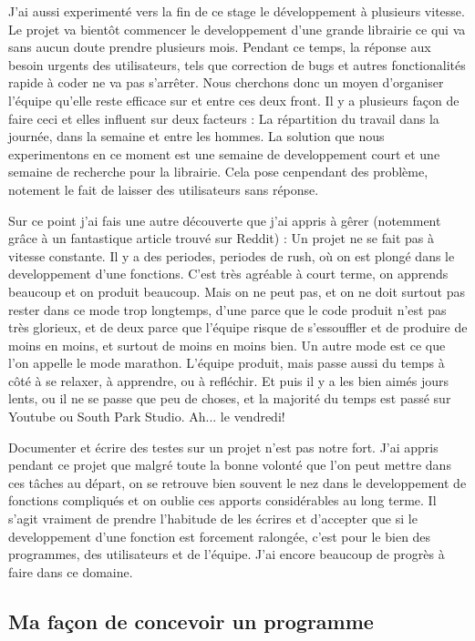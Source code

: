 J'ai aussi experimenté vers la fin de ce stage le développement à plusieurs vitesse. Le projet va bientôt commencer le developpement d'une grande librairie ce qui va sans aucun doute prendre plusieurs mois. Pendant ce temps, la réponse aux besoin urgents des utilisateurs, tels que correction de bugs et autres fonctionalités rapide à coder ne va pas s'arrêter. Nous cherchons donc un moyen d'organiser l'équipe qu'elle reste efficace sur et entre ces deux front. Il y a plusieurs façon de faire ceci et elles influent sur deux facteurs : La répartition du travail dans la journée, dans la semaine et entre les hommes. La solution que nous experimentons en ce moment est une semaine de developpement court et une semaine de recherche pour la librairie. Cela pose cenpendant des problème, notement le fait de laisser des utilisateurs sans réponse.

Sur ce point j'ai fais une autre découverte que j'ai appris à gêrer (notemment grâce à un fantastique article trouvé sur Reddit)%
: Un projet ne se fait pas à vitesse constante. Il y a des periodes, periodes de rush, où on est plongé dans le developpement d'une fonctions. C'est très agréable à court terme, on apprends beaucoup et on produit beaucoup. Mais on ne peut pas, et on ne doit surtout pas rester dans ce mode trop longtemps, d'une parce que le code produit n'est pas très glorieux, et de deux parce que l'équipe risque de s'essouffler et de produire de moins en moins, et surtout de moins en moins bien. Un autre mode est ce que l'on appelle le mode marathon. L'équipe produit, mais passe aussi du temps à côté à se relaxer, à apprendre, ou à refléchir. Et puis il y a les bien aimés jours lents, ou il ne se passe que peu de choses, et la majorité du temps est passé sur Youtube ou South Park Studio. Ah... le vendredi!

Documenter et écrire des testes sur un projet n'est pas notre fort. J'ai appris pendant ce projet que malgré toute la bonne volonté que l'on peut mettre dans ces tâches au départ, on se retrouve bien souvent le nez dans le developpement de fonctions compliqués et on oublie ces apports considérables au long terme. Il s'agit vraiment de prendre l'habitude de les écrires et d'accepter que si le developpement d'une fonction est forcement ralongée, c'est pour le bien des programmes, des utilisateurs et de l'équipe. J'ai encore beaucoup de progrès à faire dans ce domaine.

\subsection{Ma façon de concevoir un programme}

